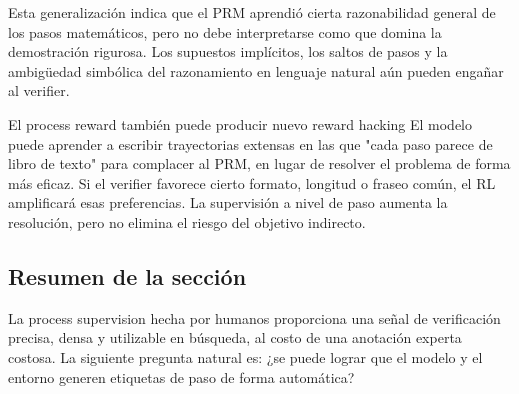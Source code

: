 
Esta generalización indica que el PRM aprendió cierta razonabilidad general de los pasos matemáticos, pero no debe interpretarse como que domina la demostración rigurosa. Los supuestos implícitos, los saltos de pasos y la ambigüedad simbólica del razonamiento en lenguaje natural aún pueden engañar al verifier.

\begin{warningbox}{El process reward también puede producir nuevo reward hacking}
El modelo puede aprender a escribir trayectorias extensas en las que "cada paso parece de libro de texto" para complacer al PRM, en lugar de resolver el problema de forma más eficaz. Si el verifier favorece cierto formato, longitud o fraseo común, el RL amplificará esas preferencias. La supervisión a nivel de paso aumenta la resolución, pero no elimina el riesgo del objetivo indirecto.
\end{warningbox}

\subsection{Resumen de la sección}

La process supervision hecha por humanos proporciona una señal de verificación precisa, densa y utilizable en búsqueda, al costo de una anotación experta costosa. La siguiente pregunta natural es: ¿se puede lograr que el modelo y el entorno generen etiquetas de paso de forma automática?

